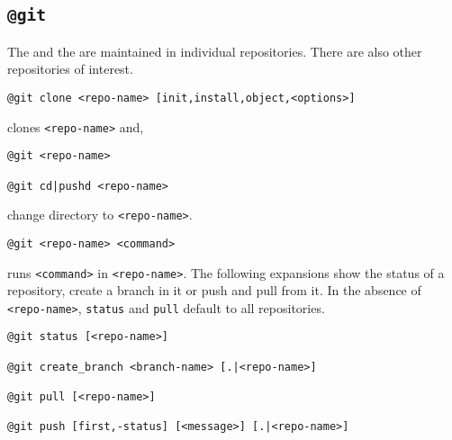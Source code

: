 \subsection{\texttt{@git}}
\label{git}

The  and the  are maintained in individual repositories. There are also other repositories of interest.
%
\begin{verbatim}
@git clone <repo-name> [init,install,object,<options>]
\end{verbatim}
%
clones \texttt{<repo-name>} and,
%
\begin{verbatim}
@git <repo-name>

@git cd|pushd <repo-name>
\end{verbatim}
%
change directory to \texttt{<repo-name>}.
%
\begin{verbatim}
@git <repo-name> <command>
\end{verbatim}
%
runs \texttt{<command>} in \texttt{<repo-name>}. The following expansions show the status of a repository, create a branch in it or push and pull from it. In the absence of \texttt{<repo-name>}, \texttt{status} and \texttt{pull} default to all repositories.
%
\begin{verbatim}
@git status [<repo-name>]

@git create_branch <branch-name> [.|<repo-name>]

@git pull [<repo-name>]

@git push [first,-status] [<message>] [.|<repo-name>]
\end{verbatim}